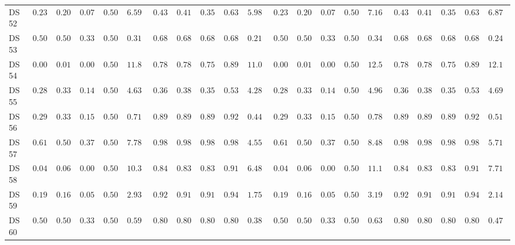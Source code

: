 {\begin{longtable}{|l|ccccc|ccccc|ccccc|ccccc|}
		DS 52 & $0.2311$ & $0.2000$ & $0.0751$ & $0.5000$ & $6.5915$ & $0.4356$ & $0.4183$ & $0.3543$ & $0.6365$ & $\boldsymbol{5.9819}$ & $0.2311$ & $0.2000$ & $0.0751$ & $0.5000$ & $7.1663$ & $0.4356$ & $0.4183$ & $0.3543$ & $0.6365$ & $6.8770$ \\
		DS 53 & $0.5000$ & $0.5000$ & $0.3333$ & $0.5000$ & $0.3182$ & $0.6800$ & $0.6800$ & $0.6800$ & $0.6800$ & $\boldsymbol{0.2110}$ & $0.5000$ & $0.5000$ & $0.3333$ & $0.5000$ & $0.3473$ & $0.6800$ & $0.6800$ & $0.6800$ & $0.6800$ & $0.2496$ \\
		DS 54 & $0.0033$ & $0.0167$ & $0.0001$ & $0.5000$ & $11.8728$ & $0.7833$ & $0.7874$ & $0.7542$ & $0.8919$ & $\boldsymbol{11.0460}$ & $0.0033$ & $0.0167$ & $0.0001$ & $0.5000$ & $12.5589$ & $0.7833$ & $0.7874$ & $0.7542$ & $0.8919$ & $12.1095$ \\
		DS 55 & $0.2872$ & $0.3333$ & $0.1488$ & $0.5000$ & $4.6345$ & $0.3670$ & $0.3819$ & $0.3515$ & $0.5364$ & $\boldsymbol{4.2864}$ & $0.2872$ & $0.3333$ & $0.1488$ & $0.5000$ & $4.9633$ & $0.3670$ & $0.3819$ & $0.3515$ & $0.5364$ & $4.6911$ \\
		DS 56 & $0.2933$ & $0.3333$ & $0.1512$ & $0.5000$ & $0.7127$ & $0.8933$ & $0.8947$ & $0.8922$ & $0.9210$ & $\boldsymbol{0.4449}$ & $0.2933$ & $0.3333$ & $0.1512$ & $0.5000$ & $0.7844$ & $0.8933$ & $0.8947$ & $0.8922$ & $0.9210$ & $0.5163$ \\
		DS 57 & $0.6122$ & $0.5000$ & $0.3797$ & $0.5000$ & $7.7828$ & $0.9837$ & $0.9828$ & $0.9828$ & $0.9828$ & $\boldsymbol{4.5584}$ & $0.6122$ & $0.5000$ & $0.3797$ & $0.5000$ & $8.4880$ & $\boldsymbol{0.9837}$ & $\boldsymbol{0.9828}$ & $\boldsymbol{0.9828}$ & $\boldsymbol{0.9828}$ & $5.7173$ \\
		DS 58 & $0.0426$ & $0.0667$ & $0.0054$ & $0.5000$ & $10.3802$ & $0.8475$ & $0.8391$ & $0.8371$ & $0.9138$ & $\boldsymbol{6.4816}$ & $0.0426$ & $0.0667$ & $0.0054$ & $0.5000$ & $11.1244$ & $\boldsymbol{0.8475}$ & $\boldsymbol{0.8391}$ & $\boldsymbol{0.8371}$ & $\boldsymbol{0.9138}$ & $7.7170$ \\
		DS 59 & $0.1933$ & $0.1667$ & $0.0540$ & $0.5000$ & $2.9394$ & $0.9267$ & $0.9123$ & $0.9126$ & $0.9474$ & $\boldsymbol{1.7551}$ & $0.1933$ & $0.1667$ & $0.0540$ & $0.5000$ & $3.1932$ & $0.9267$ & $0.9123$ & $0.9126$ & $0.9474$ & $2.1456$ \\
		DS 60 & $0.5075$ & $0.5000$ & $0.3366$ & $0.5000$ & $0.5943$ & $0.8060$ & $0.8044$ & $0.8032$ & $0.8044$ & $\boldsymbol{0.3881}$ & $0.5075$ & $0.5000$ & $0.3366$ & $0.5000$ & $0.6395$ & $0.8060$ & $0.8044$ & $0.8032$ & $0.8044$ & $0.4737$ \\

\end{longtable}}
